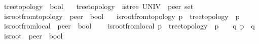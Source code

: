 \begin{isabellebody}
\isanewline
{}\isamarkupfalse%
\ tree{\isacharunderscore}{\kern0pt}topology\ {\isacharcolon}{\kern0pt}{\isacharcolon}{\kern0pt}\ {\isachardoublequoteopen}bool{\isachardoublequoteclose}\ \isanewline
\ \ {\isachardoublequoteopen}tree{\isacharunderscore}{\kern0pt}topology\ {\isasymequiv}\ is{\isacharunderscore}{\kern0pt}tree\ {\isacharparenleft}{\kern0pt}UNIV\ {\isacharcolon}{\kern0pt}{\isacharcolon}{\kern0pt}\ {\isacharprime}{\kern0pt}peer\ set{\isacharparenright}{\kern0pt}\ {\isacharparenleft}{\kern0pt}{\isasymG}{\isacharparenright}{\kern0pt}{\isachardoublequoteclose}\isanewline
\isanewline
{}\isamarkupfalse%
\ is{\isacharunderscore}{\kern0pt}root{\isacharunderscore}{\kern0pt}from{\isacharunderscore}{\kern0pt}topology\ {\isacharcolon}{\kern0pt}{\isacharcolon}{\kern0pt}\ {\isachardoublequoteopen}{\isacharprime}{\kern0pt}peer\ {\isasymRightarrow}\ bool{\isachardoublequoteclose}\ \isanewline
\ \ {\isachardoublequoteopen}is{\isacharunderscore}{\kern0pt}root{\isacharunderscore}{\kern0pt}from{\isacharunderscore}{\kern0pt}topology\ p\ {\isasymequiv}\ {\isacharparenleft}{\kern0pt}tree{\isacharunderscore}{\kern0pt}topology\ {\isasymand}\ {\isasymG}{\isasymlangle}{\isasymrightarrow}p{\isasymrangle}\ {\isacharequal}{\kern0pt}\ {\isacharbraceleft}{\kern0pt}{\isacharbraceright}{\kern0pt}{\isacharparenright}{\kern0pt}{\isachardoublequoteclose}\isanewline
\isanewline
{}\isamarkupfalse%
\ is{\isacharunderscore}{\kern0pt}root{\isacharunderscore}{\kern0pt}from{\isacharunderscore}{\kern0pt}local\ {\isacharcolon}{\kern0pt}{\isacharcolon}{\kern0pt}\ {\isachardoublequoteopen}{\isacharprime}{\kern0pt}peer\ {\isasymRightarrow}\ bool{\isachardoublequoteclose}\ \ \isanewline
\ \ {\isachardoublequoteopen}is{\isacharunderscore}{\kern0pt}root{\isacharunderscore}{\kern0pt}from{\isacharunderscore}{\kern0pt}local\ p\ {\isasymequiv}\ tree{\isacharunderscore}{\kern0pt}topology\ {\isasymand}\ {\isasymP}\isactrlsub {\isacharquery}{\kern0pt}{\isacharparenleft}{\kern0pt}p{\isacharparenright}{\kern0pt}\ {\isacharequal}{\kern0pt}\ {\isacharbraceleft}{\kern0pt}{\isacharbraceright}{\kern0pt}\ {\isasymand}\ {\isacharparenleft}{\kern0pt}{\isasymforall}q{\isachardot}{\kern0pt}\ p\ {\isasymnotin}\ {\isasymP}\isactrlsub {\isacharbang}{\kern0pt}{\isacharparenleft}{\kern0pt}q{\isacharparenright}{\kern0pt}{\isacharparenright}{\kern0pt}{\isachardoublequoteclose}\isanewline
\isanewline
{}\isamarkupfalse%
\ is{\isacharunderscore}{\kern0pt}root\ {\isacharcolon}{\kern0pt}{\isacharcolon}{\kern0pt}\ {\isachardoublequoteopen}{\isacharprime}{\kern0pt}peer\ {\isasymRightarrow}\ bool{\isachardoublequoteclose}\ \ \isanewline

\end{isabellebody}
